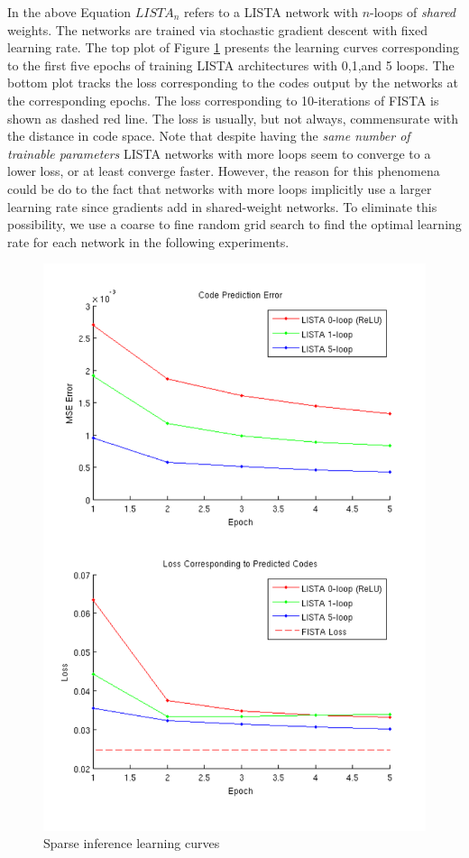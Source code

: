 In the above Equation $LISTA_n$ refers to a LISTA network with $n$-loops of
\emph{shared} weights. The networks are trained via stochastic gradient descent
with fixed learning rate. The top plot of Figure \ref{fig:learning_curves}
presents the learning curves corresponding to the first five epochs of training
LISTA architectures with 0,1,and 5 loops. The bottom plot tracks the loss
corresponding to the codes output by the networks at the corresponding epochs.
The loss corresponding to 10-iterations of FISTA is shown as dashed red line. 
The loss is usually, but not always, commensurate with the distance in code
space. Note that despite having the \emph{same number of trainable parameters}
LISTA networks with more loops seem to converge to a lower loss, or at least
converge faster.  However, the reason for this phenomena could be do to the
fact that networks with more loops implicitly use a larger learning rate since
gradients add in shared-weight networks. To eliminate this possibility, we use
a coarse to fine random grid search to find the optimal learning rate for each
network in the following experiments.

\begin{figure} \centering
\includegraphics[scale=0.75]{./figures/LISTA/code_pred.pdf} \caption{Sparse
inference learning curves} \label{fig:learning_curves} \end{figure}  

